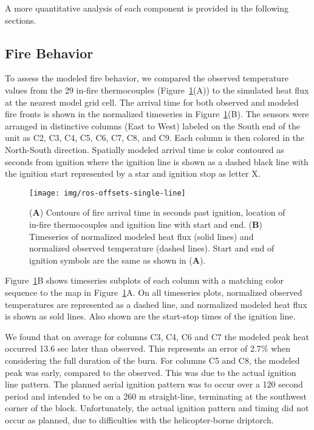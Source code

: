 \documentclass[preprints,article,accept,moreauthors,pdftex]{Definitions/mdpi}
\begin{document}
A more quantitative analysis of each component is provided in the following sections.

\subsection{Fire Behavior}

To assess the modeled fire behavior, we compared the observed temperature values from the 29 in-fire thermocouples (Figure~\ref{fig2}(A)) to the simulated heat flux at the nearest model grid cell. The arrival time for both observed and modeled fire fronts is shown in the normalized timeseries in Figure~\ref{fig2}(B).
The sensors were arranged in distinctive columns (East to West) labeled on the South end of the unit as C2, C3, C4, C5, C6, C7, C8, and C9. Each column is then colored in the North-South direction. Spatially modeled arrival time is color contoured as seconds from ignition where the ignition line is shown as a dashed black line with the ignition start represented by a star and ignition stop as letter X.

\begin{figure}[H]
\centering
 \texttt{[image: img/ros-offsets-single-line]}
 \caption{(\textbf{A}) Contours of fire arrival time in seconds past ignition, location of in-fire thermocouples and ignition line with start and end. (\textbf{B}) Timeseries of normalized modeled heat flux (solid lines) and normalized observed temperature (dashed lines). Start and end of ignition symbols are the same as shown in (\textbf{A}). \label{fig2}}
 \end{figure}

Figure~\ref{fig2}B shows timeseries subplots of each column with a matching color sequence to the map in Figure~\ref{fig2}A. On all timeseries plots, normalized observed temperatures are represented as a dashed line, and normalized modeled heat flux is shown as sold lines. Also shown are the start-stop times of the ignition line.

We found that on average for columns C3, C4, C6 and C7 the modeled peak heat occurred 13.6 sec later than observed. This represents an error of 2.7$\%$ when considering the full duration of the burn. For columns C5 and C8, the modeled peak was early, compared to the observed. This was due to the actual ignition line pattern. The planned aerial ignition pattern was to occur over a 120 second period and intended to be on a 260 m straight-line, terminating at the southwest corner of the block. Unfortunately, the actual ignition pattern and timing did not occur as planned, due to difficulties with the helicopter-borne driptorch.
\end{document}
